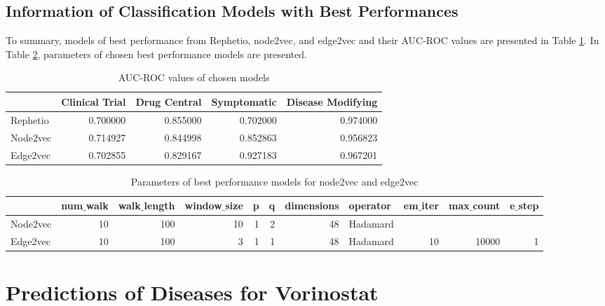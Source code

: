 \subsection{Information of Classification Models with Best Performances}

To summary, models of best performance from Rephetio, node2vec, and edge2vec and their AUC-ROC values are presented in Table \ref{tab:AUCROC_table}. In Table \ref{tab:parameters_table}, parameters of chosen best performance models are presented. 

\begin{table}[!ht]
    \centering
    \begin{tabular}{|l|r|r|r|r|}
        \hline
        \textbf{} & \textbf{Clinical Trial} & \textbf{Drug Central} & \textbf{Symptomatic} & \textbf{Disease Modifying}\\
        \hline
        Rephetio & 0.700000 & 0.855000 & 0.702000 & 0.974000 \\
        \hline
        Node2vec & 0.714927 & 0.844998 & 0.852863 & 0.956823 \\
        \hline
        Edge2vec & 0.702855 & 0.829167 & 0.927183 & 0.967201\\
        \hline
    \end{tabular}
    \captionsetup{justification=centering}
    \caption{AUC-ROC values of chosen models}
    \label{tab:AUCROC_table}
\end{table}

\begin{table}[!ht]
    \centering
    \tiny
    \begin{tabular}{|l|r|r|r|r|r|r|l|r|r|r|}
        \hline
        \textbf{} & \textbf{num$\_$walk} & \textbf{walk$\_$length} & \textbf{window$\_$size} & \textbf{p} & \textbf{q} & \textbf{dimensions} & \textbf{operator} & \textbf{em$\_$iter} & \textbf{max$\_$count} & \textbf{e$\_$step}\\
        \hline
        Node2vec & 10 & 100 & 10 & 1 & 2 & 48 & Hadamard \\
        \hline
        Edge2vec & 10 & 100 & 3 & 1 & 1 & 48 & Hadamard & 10 & 10000 & 1 \\
        \hline
    \end{tabular}
    \captionsetup{justification=centering}
    \caption{Parameters of best performance models for node2vec and edge2vec}
    \label{tab:parameters_table}
\end{table}

\section{Predictions of Diseases for Vorinostat}


